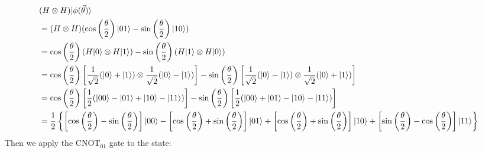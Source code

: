 \documentclass{article}
\begin{document}
\begin{align*}
	 & (H \otimes H)|\phi(\vec{\theta})\rangle                                                                                                                                                                                                                                                                    \\
	 & = (H \otimes H)(\cos\left(\frac{\theta}{2}\right)|01\rangle - \sin\left(\frac{\theta}{2}\right)|10\rangle)                                                                                                                                                                                                 \\
	 & =  \cos\left(\frac{\theta}{2}\right)(H|0\rangle \otimes H|1\rangle) - \sin\left(\frac{\theta}{2}\right)(H|1\rangle \otimes H|0\rangle)                                                                                                                                                                     \\
	 & = \cos\left(\frac{\theta}{2}\right)\left[\frac{1}{\sqrt{2}}(|0\rangle+|1\rangle) \otimes \frac{1}{\sqrt{2}}(|0\rangle - |1\rangle)\right] - \sin\left(\frac{\theta}{2}\right)\left[\frac{1}{\sqrt{2}}(|0\rangle - |1\rangle) \otimes \frac{1}{\sqrt{2}}(|0\rangle + |1\rangle)\right]                      \\
	 & = \cos\left(\frac{\theta}{2}\right)\left[\frac{1}{2}(|00\rangle - |01\rangle + |10\rangle - |11\rangle)\right] - \sin\left(\frac{\theta}{2}\right)\left[\frac{1}{2}(|00\rangle + |01\rangle - |10\rangle - |11\rangle)\right]                                                                              \\
	 & = \frac{1}{2}\left\{\left[\cos\left(\frac{\theta}{2}\right) - \sin\left(\frac{\theta}{2}\right)\right]\ket{00} - \left[\cos\left(\frac{\theta}{2}\right) + \sin\left(\frac{\theta}{2}\right)\right] \ket{01} + \left[\cos\left(\frac{\theta}{2}\right) + \sin\left(\frac{\theta}{2}\right)\right] \ket{10}
	+ \left[\sin\left(\frac{\theta}{2}\right)- \cos\left(\frac{\theta}{2}\right) \right]\ket{11} \right\}                                                                                                                                                                                                         \\
\end{align*}
Then we apply the \(\text{CNOT}_{01}\) gate to the state:
\end{document}
